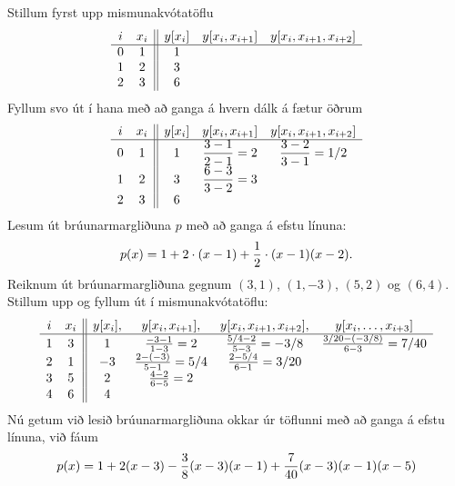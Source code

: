 \documentclass[letterpaper,10pt,icelandic]{sphinxmanual}
\begin{document}
Stillum fyrst upp mismunakvótatöflu
\begin{gather}
\begin{split}\begin{array}{cc||ccc}
    i & x_i & y[x_i] & y[x_i,x_{i+1}] & y[x_i,x_{i+1},x_{i+2}] \\
    \hline
    0 & 1   &  1     &    &   \\
    1 & 2   &  3     &    &   \\
    2 & 3   &  6     &    &
  \end{array}\end{split}\notag
\end{gather}
Fyllum svo út í hana með að ganga á hvern dálk á fætur öðrum
\begin{gather}
\begin{split}\begin{array}{cc||ccc}
    i & x_i & y[x_i] & y[x_i,x_{i+1}] & y[x_i,x_{i+1},x_{i+2}] \\
    \hline
    0 & 1 & 1 & \dfrac{3-1}{2-1} = 2 & \dfrac{3-2}{3-1} = 1/2  \\
    1 & 2 & 3 & \dfrac{6-3}{3-2} = 3 & \\
    2 & 3 & 6 & &
  \end{array}\end{split}\notag
\end{gather}
Lesum út brúunarmargliðuna \(p\) með að ganga á efstu línuna:
\begin{gather}
\begin{split}p(x) = 1 + 2 \cdot (x-1) + \frac{1}{2} \cdot (x-1)(x-2).\end{split}\notag
\end{gather}
Reiknum út brúunarmargliðuna gegnum \((3,1)\), \((1,-3)\),
\((5,2)\) og \((6,4)\). Stillum upp og fyllum út í
mismunakvótatöflu:
\begin{gather}
\begin{split}\begin{array}{cc||cccc}
    i & x_i & y[x_i], & y[x_i,x_{i+1}], &
    y[x_i,x_{i+1},x_{i+2}], & y[x_i,\ldots,x_{i+3}] \\
    \hline
    1 & 3 & 1 & \frac{-3-1}{1-3} = 2 & \frac{5/4-2}{5-3} = -3/8 &
    \frac{3/20-(-3/8)}{6-3} = 7/40 \\
    2 & 1 & -3 & \frac{2-(-3)}{5-1} = 5/4 &
    \frac{2-5/4}{6-1} = 3/20 & \\
    3 & 5 & 2 & \frac{4-2}{6-5} = 2 & & \\
    4 & 6 & 4 & & &
  \end{array}\end{split}\notag
\end{gather}
Nú getum við lesið brúunarmargliðuna okkar úr töflunni með að ganga á
efstu línuna, við fáum
\begin{gather}
\begin{split}p(x) = 1 + 2(x-3) - \frac 38 (x-3)(x-1)
  + \frac 7{40} (x-3)(x-1)(x-5)\end{split}\notag
\end{gather}
\end{document}
